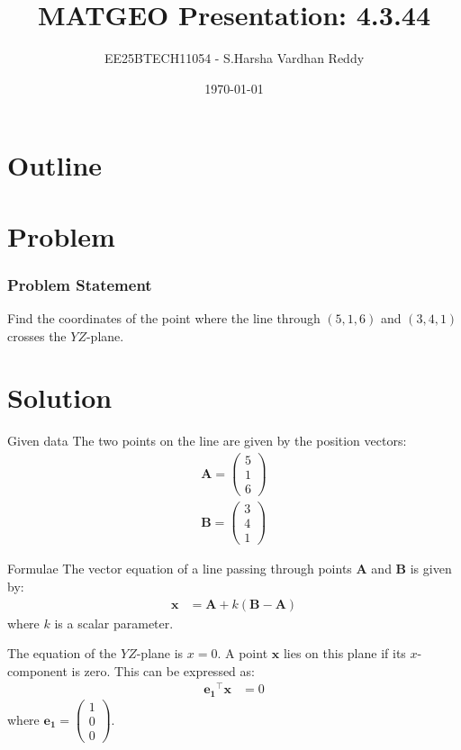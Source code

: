 \documentclass{beamer}
\title{MATGEO Presentation: 4.3.44}
\author{EE25BTECH11054 - S.Harsha Vardhan Reddy}
\date{\today}
\providecommand{\brak}[1]{\ensuremath{\left(#1\right)}}
\theoremstyle{remark}
\newcommand{\myvec}[1]{\ensuremath{\begin{pmatrix}#1\end{pmatrix}}}
\let\vec\mathbf
\begin{document}
\begin{frame}
\titlepage
\end{frame}

\section*{Outline}
\begin{frame}
\tableofcontents
\end{frame}

\section{Problem}
\begin{frame}
\frametitle{Problem Statement}
Find the coordinates of the point where the line through \brak{5, 1, 6} and \brak{3, 4, 1} crosses the $YZ$-plane.
\end{frame}

\section{Solution}
\begin{frame}{Given data}
The two points on the line are given by the position vectors:
\begin{align}
 \vec{A} = \myvec{5\\1\\6} \\
 \vec{B} = \myvec{3\\4\\1}
\end{align}
\end{frame}

\begin{frame}{Formulae}
The vector equation of a line passing through points $\vec{A}$ and $\vec{B}$ is given by:
\begin{align}
 \vec{x} &= \vec{A} + k\brak{\vec{B}-\vec{A}}
\end{align}
where $k$ is a scalar parameter.

The equation of the $YZ$-plane is $x=0$. A point $\vec{x}$ lies on this plane if its $x$-component is zero. This can be expressed as:
\begin{align}
 \vec{e_1}^\top\vec{x} &= 0
\end{align}
where $\vec{e_1} = \myvec{1\\0\\0}$.
\end{frame}
\end{document}
